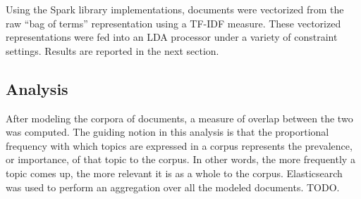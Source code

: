 Using the Spark library implementations, documents were vectorized from the raw ``bag of terms'' representation using a TF-IDF measure.
These vectorized representations were fed into an LDA processor under a variety of constraint settings.
Results are reported in the next section.

\subsection{Analysis}

After modeling the corpora of documents, a measure of overlap between the two was computed.
The guiding notion in this analysis is that the proportional frequency with which topics are expressed in a corpus represents the prevalence, or importance, of that topic to the corpus.
In other words, the more frequently a topic comes up, the more relevant it is as a whole to the corpus.
Elasticsearch was used to perform an aggregation over all the modeled documents.
{\color{red}TODO.}
